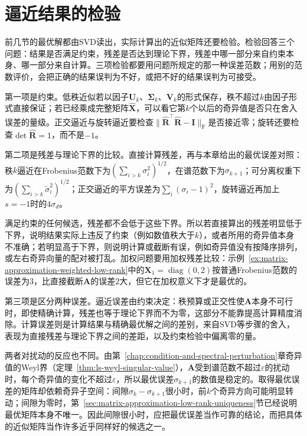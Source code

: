 
\section{逼近结果的检验}
\label{sec:matrix-approximation-verification}

前几节的最优解都由SVD读出，实际计算出的近似矩阵还要检验。检验回答三个问题：结果是否满足约束，残差是否达到理论下界，残差中哪一部分来自约束本身、哪一部分来自计算。三项检验都要用问题所规定的那一种误差范数；用别的范数评价，会把正确的结果误判为不好，或把不好的结果误判为可接受。

第一项是约束。低秩近似若以因子$\bm U_k$、$\bm\Sigma_k$、$\bm V_k$的形式保存，秩不超过$k$由因子形式直接保证；若已经乘成完整矩阵$\widehat{\bm X}$，可以看它第$k$个以后的奇异值是否只在舍入误差的量级。正交逼近与旋转逼近要检查$\lVert\widehat{\bm R}^\top\widehat{\bm R}-\bm I\rVert_{\mathrm F}$是否接近零；旋转还要检查$\det\widehat{\bm R}=1$，而不是$-1$。

第二项是残差与理论下界的比较。直接计算残差，再与本章给出的最优误差对照：秩$k$逼近在Frobenius范数下为$(\sum_{i>k}\sigma_i^2)^{1/2}$，在谱范数下为$\sigma_{k+1}$；可分离权重下为$(\sum_{i>k}\tilde\sigma_i^2)^{1/2}$；正交逼近的平方误差为$\sum_i(\sigma_i-1)^2$，旋转逼近再加上$s=-1$时的$4\sigma_d$。

满足约束的任何候选，残差都不会低于这些下界。所以若直接算出的残差明显低于下界，说明结果实际上违反了约束（例如数值秩大于$k$），或者所用的奇异值本身不准确；若明显高于下界，则说明计算或截断有误，例如奇异值没有按降序排列，或左右奇异向量的配对被打乱。加权问题要用加权残差比较：示例~\ref{ex:matrix-approximation-weighted-low-rank}中的$\bm X_1=\operatorname{diag}(0,2)$按普通Frobenius范数的误差为$3$，比直接截断$\bm A$的误差$2$大，但它在加权意义下才是最优的。

第三项是区分两种误差。逼近误差由约束决定：秩预算或正交性使$\bm A$本身不可行时，即使精确计算，残差也等于理论下界而不为零，这部分不能靠提高计算精度消除。计算误差则是计算结果与精确最优解之间的差别，来自SVD等步骤的舍入，表现为直接残差与理论下界之间的差距，以及约束检验中偏离零的量。

两者对扰动的反应也不同。由第~\ref{chap:condition-and-spectral-perturbation}章奇异值的Weyl界（定理~\ref{thm:ls-weyl-singular-value}），$\bm A$受到谱范数不超过$\varepsilon$的扰动时，每个奇异值的变化不超过$\varepsilon$，所以最优误差$\sigma_{k+1}$的数值是稳定的。取得最优误差的矩阵却依赖奇异子空间：间隙$\sigma_k-\sigma_{k+1}$很小时，前$k$个奇异方向可能明显转动；间隙为零时，第~\ref{sec:matrix-approximation-low-rank-uniqueness}节已经说明最优矩阵本身不唯一。因此间隙很小时，应把最优误差当作可靠的结论，而把具体的近似矩阵当作许多近乎同样好的候选之一。

